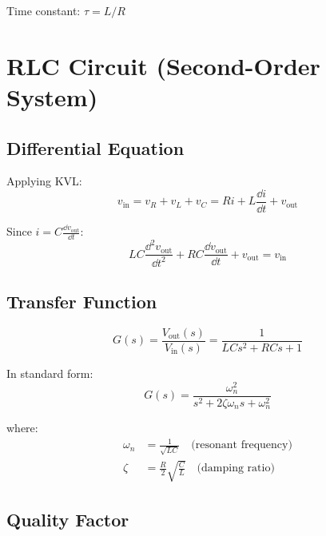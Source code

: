 Time constant: $\tau = L/R$

\section{RLC Circuit (Second-Order System)}
\label{sec:rlc_circuit}



\subsection{Differential Equation}

Applying KVL:
\begin{equation}
v_{\text{in}} = v_R + v_L + v_C = Ri + L\frac{\dd i}{\dd t} + v_{\text{out}}
\end{equation}

Since $i = C\frac{\dd v_{\text{out}}}{\dd t}$:
\begin{equation}
\boxed{LC\frac{\dd^2 v_{\text{out}}}{\dd t^2} + RC\frac{\dd v_{\text{out}}}{\dd t} + v_{\text{out}} = v_{\text{in}}}
\end{equation}

\subsection{Transfer Function}

\begin{equation}
G(s) = \frac{V_{\text{out}}(s)}{V_{\text{in}}(s)} = \frac{1}{LCs^2 + RCs + 1}
\end{equation}

In standard form:
\begin{equation}
G(s) = \frac{\omega_n^2}{s^2 + 2\zeta\omega_n s + \omega_n^2}
\end{equation}

where:
\begin{align}
\omega_n &= \frac{1}{\sqrt{LC}} \quad \text{(resonant frequency)} \\
\zeta &= \frac{R}{2}\sqrt{\frac{C}{L}} \quad \text{(damping ratio)}
\end{align}

\subsection{Quality Factor}

